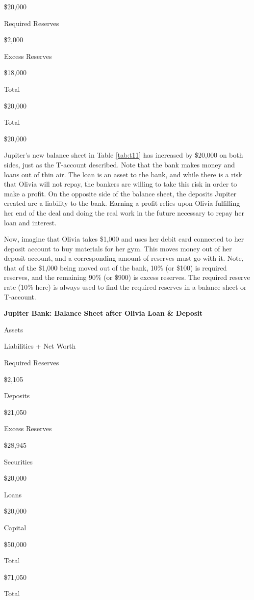 \documentclass[
]{book}
\begin{document}
\$20,000

Required Reserves

\$2,000

Excess Reserves

\$18,000

Total

\$20,000

Total

\$20,000

Jupiter's new balance sheet in Table \ref{tab:t11} has increased by \$20,000 on both sides, just as the T-account described. Note that the bank makes money and loans out of thin air. The loan is an asset to the bank, and while there is a risk that Olivia will not repay, the bankers are willing to take this risk in order to make a profit. On the opposite side of the balance sheet, the deposits Jupiter created are a liability to the bank. Earning a profit relies upon Olivia fulfilling her end of the deal and doing the real work in the future necessary to repay her loan and interest.

Now, imagine that Olivia takes \$1,000 and uses her debit card connected to her deposit account to buy materials for her gym. This moves money out of her deposit account, and a corresponding amount of reserves must go with it. Note, that of the \$1,000 being moved out of the bank, 10\% (or \$100) is required reserves, and the remaining 90\% (or \$900) is excess reserves. The required reserve rate (10\% here) is always used to find the required reserves in a balance sheet or T-account.

\label{tab:t11}\textbf{Jupiter Bank: Balance Sheet after Olivia Loan \& Deposit}

Assets

Liabilities + Net Worth

Required Reserves

\$2,105

Deposits

\$21,050

Excess Reserves

\$28,945

Securities

\$20,000

Loans

\$20,000

Capital

\$50,000

Total

\$71,050

Total
\end{document}
